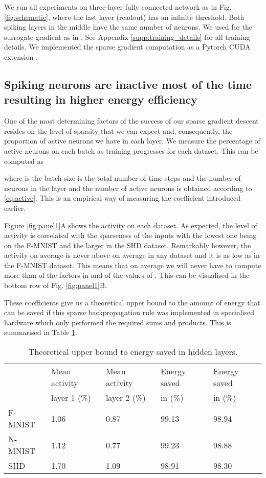 \documentclass{article}
\begin{document}
We run all experiments on three-layer fully connected network as in Fig. \ref{fig:schematic}, where the last layer (readout) has an infinite threshold. Both spiking layers in the middle have the same number of neurons. We used  for the surrogate gradient as in \cite{zenke2021remarkable}. See Appendix \ref{supp:training_details} for all training details. We implemented the sparse gradient computation as a Pytorch CUDA extension \cite{Paszke2019pytorch}. 


\subsection{Spiking neurons are inactive most of the time resulting in higher energy efficiency}

One of the most determining factors of the success of our sparse gradient descent resides on the level of sparsity that we can expect and, consequently, the proportion of active neurons we have in each layer. We measure the percentage of active neurons on each batch as training progresses for each dataset. This can be computed as 



where  is the batch size  is the total number of time steps and  the number of neurons in the layer and the number of active neurons is obtained according to \eqref{eq:active}. This is an empirical way of measuring the coefficient  introduced earlier.

Figure \ref{fig:panel1}A shows the activity on each dataset. As expected, the level of activity is correlated with the sparseness of the inputs with the lowest one being on the F-MNIST and the larger in the SHD dataset. Remarkably however, the activity on average is never above  on average in any dataset and it is as low as  in the F-MNIST dataset. This means that on average we will never have to compute more than  of the factors in  and  of the values of . This can be visualised in the bottom row of Fig. \ref{fig:panel1}B.

These coefficients give us a theoretical upper bound to the amount of energy that can be saved if this sparse backpropagation rule was implemented in specialised hardware which only performed the required sums and products. This is summarised in Table \ref{table:energy}.

\begin{table}[h]
  \caption{Theoretical upper bound to energy saved in hidden layers.}
  \centering
  \begin{tabular}{lllll}
    \toprule
\multirow{2}{*}{} 
    & Mean activity & Mean activity & Energy saved & Energy saved \\ 
    & layer 1 (\%) & layer 2 (\%) & in  (\%) & in  (\%) \\ 
    \midrule
    F-MNIST     & 1.06        & 0.87  & 99.13 & 98.94\\
    N-MNIST     & 1.12        & 0.77  & 99.23 & 98.88\\
    SHD         & 1.70        & 1.09  & 98.91 & 98.30\\
    \bottomrule
  \end{tabular}
  \label{table:energy}
\end{table}
\end{document}

